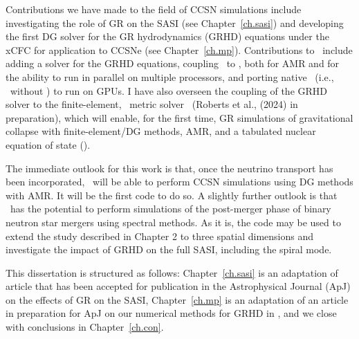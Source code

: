 Contributions we have made to the field of CCSN simulations
include investigating the role of GR
on the SASI (see Chapter~\ref{ch.sasi}) and developing the first DG solver
for the GR hydrodynamics (GRHD) equations under the xCFC
for application to CCSNe (see Chapter~\ref{ch.mp}).
Contributions to \thornado\ include adding a solver for the GRHD equations,
coupling \thornado\ to \amrex, both for AMR and for the ability to run
in parallel on multiple processors,
and porting native \thornado\ (i.e., \thornado\ without \amrex)
to run on GPUs.
I have also overseen the coupling of the GRHD solver
to the finite-element, \xcfc\ metric solver \poseidon\ (Roberts et al.,
(2024) in preparation),
which will enable, for the first time,
GR simulations of gravitational collapse with finite-element/DG methods, AMR,
and a tabulated nuclear equation of state (\eos).

The immediate outlook for this work is that, once the neutrino transport
has been incorporated, \thornado\ will be able to perform CCSN simulations
using DG methods with AMR.
It will be the first code to do so.
A slightly further outlook is that \thornado\ has the potential to perform
simulations of the post-merger phase of binary neutron star mergers
using spectral methods.
As it is, the code may be used to extend the study described in Chapter 2
to three spatial dimensions and investigate the impact of GRHD on the
full SASI, including the spiral mode.

This dissertation is structured as follows: Chapter~\ref{ch.sasi} is an adaptation
of article that has been accepted for publication in the Astrophysical Journal (ApJ)
on the effects of GR on the SASI,
Chapter~\ref{ch.mp} is an adaptation of an article in preparation for ApJ on our
numerical methods for GRHD in \thornado,
and we close with conclusions in Chapter~\ref{ch.con}.

